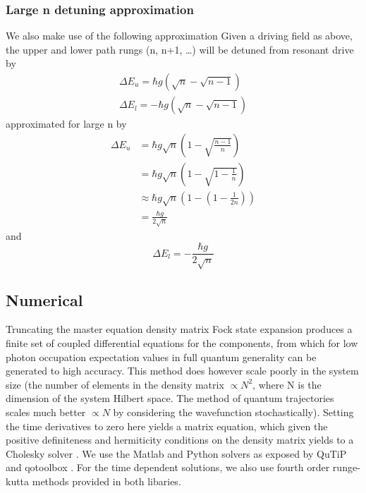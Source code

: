 \subsubsection{Large n detuning approximation}
We also make use of the following approximation \cite{Alsing1990}
Given a driving field as above, the upper and lower path rungs (n, n+1, \dots) will be detuned from resonant drive by
\begin{align}
  \Delta E_u = \hbar g (\sqrt{n}-\sqrt{n-1}) \\
  \Delta E_l = -\hbar g (\sqrt{n}-\sqrt{n-1})
\end{align}
approximated for large n by
\begin{align}
  \Delta E_u &= \hbar g \sqrt{n} \left (1-\sqrt{\frac{n-1}{n}} \right ) \\
  &= \hbar g \sqrt{n} \left (1-\sqrt{1-\frac{1}{n}} \right ) \\
  & \approx \hbar g \sqrt{n} \left ( 1- \left ( 1 - \frac{1}{2n} \right ) \right ) \\
  &= \frac{\hbar g}{2 \sqrt{n}}
\end{align}
and
\begin{equation}
  \Delta E_l = -\frac{\hbar g}{2 \sqrt{n}}
\end{equation}
\subsection{Numerical}
Truncating the master equation density matrix Fock state expansion produces a finite set of coupled differential equations for the components, from which for low photon occupation expectation values in full quantum generality can be generated to high accuracy.
This method does however scale poorly in the system size (the number of elements in the density matrix $\propto N^2$, where N is the dimension of the system Hilbert space.
The method of quantum trajectories scales much better \cite{Molmer1993} $\propto N$ by considering the wavefunction stochastically).
Setting the time derivatives to zero here yields a matrix equation, which given the positive definiteness and hermiticity conditions on the density matrix yields to a Cholesky solver \cite{Press1992}.
We use the Matlab and Python solvers as exposed by QuTiP \cite{Johansson2013a} and qotoolbox \cite{Tan}. For the time dependent solutions, we also use fourth order runge-kutta methods provided in both libaries.
